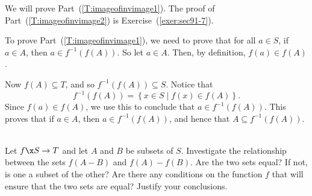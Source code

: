 %
\begin{myproof}
We will prove Part~(\ref{T:imageofinvimage1}).  The proof of 
Part~(\ref{T:imageofinvimage2}) is Exercise~(\ref{exer:sec91-7}).

To prove Part~(\ref{T:imageofinvimage1}), we need to prove that for all $a \in S$, if $a \in A$, then $a \in f^{-1} \!\left( f ( A ) \right)$.  So let $a \in A$.  Then, by definition, 
$f ( a ) \in f ( A )$.

Now $f ( A ) \subseteq T$, and so 
$f^{-1} \!\left( f ( A ) \right) \subseteq S$.  Notice that
\[
f^{-1} \!\left( f ( A ) \right) = \left\{ x \in S \mid f ( x ) \in 
f ( A ) \right\}.
\]
Since $f ( a ) \in f ( A )$, we use this to conclude that 
$a \in f^{-1}\!\left ( f ( A ) \right)$.  This proves that if $a \in A$, then 
$a \in f^{-1} \!\left( f ( A ) \right)$, and hence that 
$A \subseteq f^{-1} \!\left( f ( A ) \right)$.
\end{myproof}

\begin{activity}\label{A:function-diff2sets} \hfill \\
Let $f\x S \to T$ and let $A$ and $B$ be subsets of $S$.  Investigate the relationship between the sets $f ( A - B )$ and $f ( A ) - f ( B )$.  Are the two sets equal?  If not, is one a subset of the other?  Are there any conditions on the function $f$ that will ensure that the two sets are equal?  Justify your conclusions.
\end{activity}
\hbreak








\endinput
